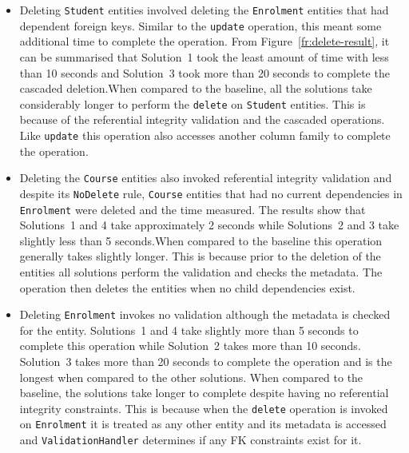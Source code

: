 \begin{itemize}
  \item Deleting \texttt{Student} entities involved  deleting  the \texttt{Enrolment} 
  entities that had dependent foreign keys. Similar to the \texttt{update}
  operation, this meant some additional time to complete the operation.
  From Figure~\ref{fr:delete-result}, it can be
  summarised that Solution~1 took the least amount of time with less than 10
  seconds and Solution~3 took more than 20 seconds to complete the cascaded
  deletion.When compared to the baseline, all the solutions take considerably
  longer to perform the \texttt{delete} on \texttt{Student} entities. This is
  because of the referential integrity validation and the cascaded operations.
  Like \texttt{update} this operation also accesses another column family to
  complete the operation.
  
  \item Deleting the \texttt{Course} entities also invoked referential
  integrity validation and despite its \texttt{NoDelete} rule, \texttt{Course}
  entities that had no current dependencies in \texttt{Enrolment} were deleted
  and the time measured. The results show that Solutions~1 and 4 take
  approximately 2 seconds while Solutions~2 and 3 take slightly less than 5
  seconds.When compared to the baseline this operation generally takes slightly
  longer. This is because prior to the deletion of the entities all solutions
  perform the validation and checks the metadata. The operation then deletes the
  entities when no child dependencies exist.
  
  \item Deleting \texttt{Enrolment} invokes no validation although the metadata
  is checked for the entity. Solutions~1 and 4 take slightly more than 5
  seconds to complete this operation while Solution~2 takes more than 10
  seconds. Solution~3 takes more than 20 seconds to complete the operation and
  is the longest when compared to the other solutions. When compared to the
  baseline, the solutions take longer to complete despite having no referential
  integrity constraints. This is because when the \texttt{delete} operation is
  invoked on \texttt{Enrolment} it is treated as any other entity and its
  metadata is accessed and \texttt{ValidationHandler} determines if any
  \ac{FK} constraints exist for it.
  
\end{itemize}

